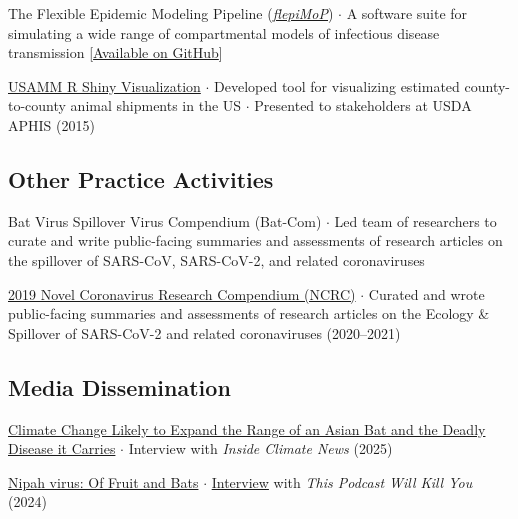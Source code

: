 \documentclass{cv}
\begin{document}
The Flexible Epidemic Modeling Pipeline (\href{https://www.flepimop.org/}{\textit{flepiMoP}}) $\cdot$ A software suite for simulating a wide range of compartmental models of infectious disease transmission [\href{https://github.com/HopkinsIDD/flepiMoP}{Available on GitHub}]

\href{https://usamm-gen-net.shinyapps.io/usamm-gen-net/}{USAMM R Shiny Visualization} $\cdot$ Developed tool for visualizing estimated county-to-county animal shipments in the US $\cdot$ Presented to stakeholders at USDA APHIS (2015)

\subsection*{Other Practice Activities}

Bat Virus Spillover Virus Compendium (Bat-Com) $\cdot$ Led team of researchers to curate and write public-facing summaries and assessments of research articles on the spillover of SARS-CoV, SARS-CoV-2, and related coronaviruses

\href{https://ncrc.jhsph.edu/}{2019 Novel Coronavirus Research Compendium (NCRC)} $\cdot$ Curated and wrote public-facing summaries and assessments of research articles on the Ecology \& Spillover of SARS-CoV-2 and related coronaviruses (2020--2021)

\subsection*{Media Dissemination}



\href{https://insideclimatenews.org/news/23082025/climate-change-to-expand-fruit-bat-habitat-nipah-virus/}{Climate Change Likely to Expand the Range of an Asian Bat and the Deadly Disease it Carries} $\cdot$ Interview with \textit{Inside Climate News} (2025)

\href{https://thispodcastwillkillyou.com/2024/05/21/episode-140-nipah-virus-of-fruit-and-bats/}{Nipah virus: Of Fruit and Bats} $\cdot$ \href{https://open.spotify.com/episode/3bF2bICaa7Ipq7s6EzCUKj?si=456f659ff8874de5}{Interview} with \textit{This Podcast Will Kill You} (2024)
\end{document}
